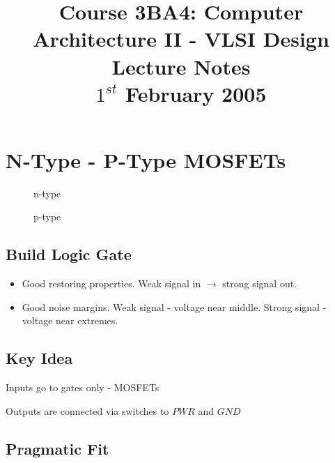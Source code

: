 \documentclass[a4paper,12pt]{article}
\begin{document}
\title{Course 3BA4: Computer Architecture II - VLSI Design \\ Lecture Notes \\ $1^{st}$ February 2005}

\maketitle

\section*{N-Type - P-Type MOSFETs}

\begin{figure}[hbtp]


\caption{n-type}

\end{figure}


\begin{figure}[hbtp]


\caption{p-type}

\end{figure}

\subsection*{Build Logic Gate}

\begin{itemize}

\item Good restoring properties. Weak signal in $\to$ strong signal out.

\item Good noise margins. Weak signal - voltage near middle. Strong
signal - voltage near extremes.

\end{itemize}

\subsection*{Key Idea}

Inputs go to gates only - MOSFETs

Outputs are connected via switches to $PWR$ and $GND$

\subsection*{Pragmatic Fit}
\end{document}
